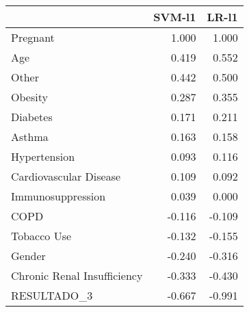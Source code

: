 \begin{tabular}{lrr}
\toprule
{} &  SVM-l1 &  LR-l1 \\
\midrule
Pregnant                    &   1.000 &  1.000 \\
Age                         &   0.419 &  0.552 \\
Other                       &   0.442 &  0.500 \\
Obesity                     &   0.287 &  0.355 \\
Diabetes                    &   0.171 &  0.211 \\
Asthma                      &   0.163 &  0.158 \\
Hypertension                &   0.093 &  0.116 \\
Cardiovascular Disease      &   0.109 &  0.092 \\
Immunosuppression           &   0.039 &  0.000 \\
COPD                        &  -0.116 & -0.109 \\
Tobacco Use                 &  -0.132 & -0.155 \\
Gender                      &  -0.240 & -0.316 \\
Chronic Renal Insufficiency &  -0.333 & -0.430 \\
RESULTADO\_3                 &  -0.667 & -0.991 \\
\bottomrule
\end{tabular}
